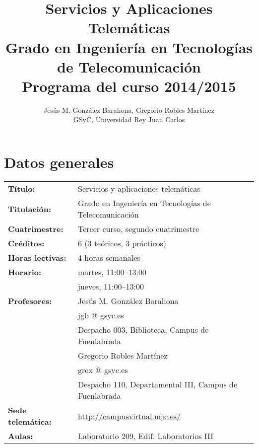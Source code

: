 \documentclass[a4paper,12pt]{article}
\title{Servicios y Aplicaciones Telemáticas \\
Grado en Ingeniería en Tecnologías de Telecomunicación \\
Programa del curso 2014/2015}
\author{Jesús M. González Barahona, Gregorio Robles Martínez \\
GSyC, Universidad Rey Juan Carlos}
\date{}
\begin{document}
\maketitle

\tableofcontents

\newpage

\section{Datos generales}

\begin{tabular}{ll}
\textbf{Título:} & Servicios y aplicaciones telemáticas \\
\textbf{Titulación:} & Grado en Ingeniería en Tecnologías de Telecomunicación \\
\textbf{Cuatrimestre:} & Tercer curso, segundo cuatrimestre \\
\textbf{Créditos:} & 6 (3 teóricos, 3 prácticos) \\
\textbf{Horas lectivas:} & 4 horas semanales \\
\textbf{Horario:} & martes, 11:00--13:00 \\
                  & jueves, 11:00--13:00 \\
\textbf{Profesores:}
& Jesús M. González Barahona \\
& \hspace{1cm}jgb @ gsyc.es \\
& \hspace{1cm}Despacho 003, Biblioteca, Campus de Fuenlabrada\\
& Gregorio Robles Martínez\\
& \hspace{1cm}grex @ gsyc.es \\
& \hspace{1cm}Despacho 110, Departamental III, Campus de Fuenlabrada\\
\textbf{Sede telemática:} & \url{http://campusvirtual.urjc.es/} \\
\textbf{Aulas:} & Laboratorio 209, Edif. Laboratorios III \\
\end{tabular}

\newpage

\end{document}
